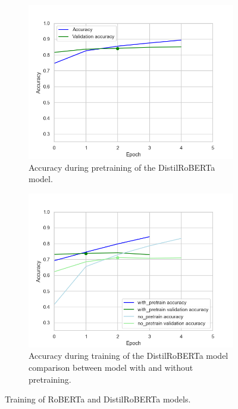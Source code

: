 \documentclass[acmsmall,nonacm]{acmart}
\begin{document}
\begin{figure}[H]
\begin{subfigure}[b]{0.4\linewidth}
      \label{fig:roberta_model_train}
    \vspace{2ex}
  \end{subfigure} 
  \begin{subfigure}[b]{0.4\linewidth}
    \includegraphics[width=\textwidth]{assets/distilroberta-base_accuracy.png}
    \caption{Accuracy during pretraining of the DistilRoBERTa model.}
    \label{fig:distilled_roberta_model_pretrain}
  \end{subfigure}%
  \hfill
  \begin{subfigure}[b]{0.4\linewidth}
    \includegraphics[width=\textwidth]{assets/distilroberta-base_comparison_with_pretrain_no_pretrain.png}
      \caption{Accuracy during training of the DistilRoBERTa model comparison between model with and without pretraining.}
      \label{fig:distilled_roberta_model_train}
  \end{subfigure} 
  \caption{Training of RoBERTa and DistilRoBERTa models.}
  \label{fig:roberta_distilroberta_training} 
\end{figure}
\end{document}
